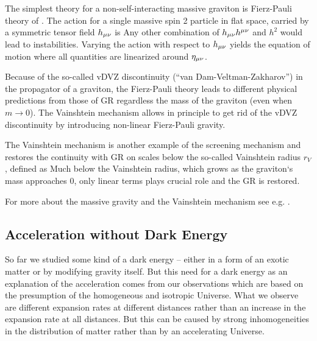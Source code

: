 The simplest theory for a non-self-interacting massive graviton is Fierz-Pauli theory of \textcite{1939RSPSA.173..211F}. The action for a single massive spin 2 particle in flat space, carried by a symmetric tensor field $h_{\mu\nu}$ is
Any other combination of $h_{\mu\nu} h^{\mu\nu}$ and $h^2$ would lead to instabilities. Varying the action with respect to $h_{\mu\nu}$ yields the equation of motion
where all quantities are linearized around $\eta_{\mu\nu}$.

Because of the so-called vDVZ discontinuity (``van Dam-Veltman-Zakharov'') in the propagator of a graviton, the Fierz-Pauli theory leads to different physical predictions from those of GR regardless the mass of the graviton (even when $m\to0$). The Vainshtein mechanism \parencite{1972PhLB...39..393V} allows in principle to get rid of the vDVZ discontinuity by introducing non-linear Fierz-Pauli gravity.

The Vainshtein mechanism is another example of the screening mechanism and restores the continuity with GR on scales below the so-called Vainshtein radius $r_V$, defined as
Much below the Vainshtein radius, which grows as the graviton`s mass approaches $0$, only linear terms plays crucial role and the GR is restored.

For more about the massive gravity and the Vainshtein mechanism see e.g. \textcite{2013CQGra..30r4001B,2012RvMP...84..671H}.

\subsection{Acceleration without Dark Energy}
So far we studied some kind of a dark energy -- either in a form of an exotic matter or by modifying gravity itself. But this need for a dark energy as an explanation of the acceleration comes from our observations which are based on the presumption of the homogeneous and isotropic Universe. What we observe are different expansion rates at different distances rather than an increase in the expansion rate at all distances. But this can be caused by strong inhomogeneities in the distribution of matter rather than by an accelerating Universe.
